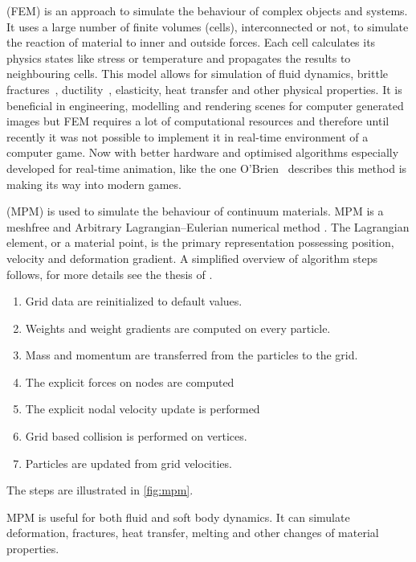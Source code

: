 
 (FEM) is an approach to simulate the behaviour of complex objects and systems. It uses a large number of finite volumes (cells), interconnected or not, to simulate the reaction of material to inner and outside forces. Each cell calculates its physics states like stress or temperature and propagates the results to neighbouring cells. This model allows for simulation of fluid dynamics, brittle fractures~\cite{brittlefracture}, ductility~\cite{ductilefracture}, elasticity, heat transfer and other physical properties. It is beneficial in engineering, modelling and rendering scenes for computer generated images but FEM requires a lot of computational resources and therefore until recently it was not possible to implement it in real-time environment of a computer game. Now with better hardware and optimised algorithms especially developed for real-time animation, like the one O'Brien~\cite{femingames} describes this method is making its way into modern games.

 (MPM) is used to simulate the behaviour of continuum materials. MPM is a meshfree and Arbitrary Lagrangian–Eulerian numerical method \cite{ALE}. The Lagrangian element, or a material point, is the primary representation possessing position, velocity and deformation gradient. A simplified overview of algorithm steps follows, for more details see the thesis of \citet{jiang2015material}.

\begin{enumerate}
    \item Grid data are reinitialized to default values.
    \item Weights and weight gradients are computed on every particle.
    \item Mass and momentum are transferred from the particles to the grid.
    \item The explicit forces on nodes are computed
    \item The explicit nodal velocity update is performed
    \item Grid based collision is performed on vertices.
    \item Particles are updated from grid velocities.
\end{enumerate}
The steps are illustrated in \cref{fig:mpm}.

MPM is useful for both fluid and soft body dynamics. It can simulate deformation, fractures, heat transfer, melting and other changes of material properties.

